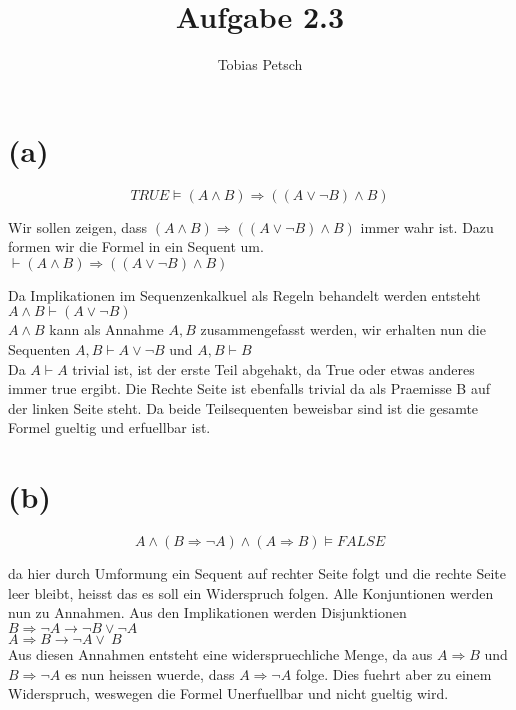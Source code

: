 \documentclass[a4paper,12pt]{article}
\title{Aufgabe 2.3}
\author{Tobias Petsch}
\date{}
\begin{document}
\maketitle

\section*{(a)}

\[
TRUE \models (A \land B) \Rightarrow ((A \lor \neg B) \land B)
\]

Wir sollen zeigen, dass $(A \land B) \Rightarrow ((A \lor \neg B) \land B)$ immer wahr ist.
Dazu formen wir die Formel in ein Sequent um. \\
$\vdash (A \land B) \Rightarrow ((A \lor \neg B) \land B)$

Da Implikationen im Sequenzenkalkuel als Regeln behandelt werden entsteht \\
$A \land B \vdash (A \lor \neg B)$ \\

$A \land B$ kann als Annahme $A,B$ zusammengefasst werden, wir erhalten nun die Sequenten 
$A,B \vdash A \lor \neg B \text{ und } A,B \vdash B$ \\
Da $A \vdash A$ trivial ist, ist der erste Teil abgehakt, da True oder etwas anderes immer true ergibt.
Die Rechte Seite ist ebenfalls trivial da als Praemisse B auf der linken Seite steht. Da beide Teilsequenten beweisbar
sind ist die gesamte Formel gueltig und erfuellbar ist. 


\section*{(b)}

\[
A \land (B \Rightarrow \neg A) \land (A \Rightarrow B) \models FALSE
\]

da hier durch Umformung ein Sequent auf rechter Seite folgt und die rechte Seite leer bleibt,
heisst das es soll ein Widerspruch folgen. Alle Konjuntionen werden nun zu Annahmen. Aus den Implikationen
werden Disjunktionen \\
$B \Rightarrow \neg A \rightarrow \neg B \lor \neg A $ \\
$A \Rightarrow B \rightarrow \neg A \lor \ B$ \\
Aus diesen Annahmen entsteht eine widerspruechliche Menge, da aus $A \Rightarrow B$ und $B \Rightarrow \neg A$ 
es nun heissen wuerde, dass $A \Rightarrow \neg A$ folge. Dies fuehrt aber zu einem Widerspruch, weswegen die Formel Unerfuellbar und nicht gueltig wird. 
\end{document}

